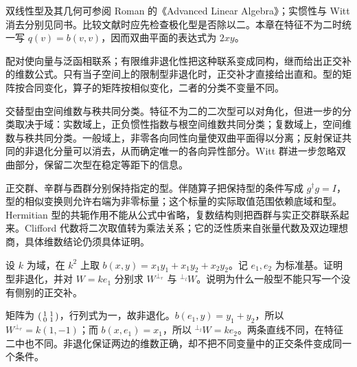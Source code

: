 \ProseParagraphBreak
双线性型及其几何可参阅 Roman 的《Advanced Linear Algebra》\cite[Chapter 11]{Roman2008AdvancedLinearAlgebra}；实惯性与 Witt 消去分别见同书\cite[Theorems 11.25--11.26, 11.34]{Roman2008AdvancedLinearAlgebra}。比较文献时应先检查极化型是否除以二。本章在特征不为二时统一写 \(q(v)=b(v,v)\)，因而双曲平面的表达式为 \(2xy\)。






\begin{chaptersummary}
	配对使向量与泛函相联系；有限维非退化性把这种联系变成同构，继而给出正交补的维数公式。只有当子空间上的限制型非退化时，正交补才直接给出直和。型的矩阵按合同变化，算子的矩阵按相似变化，二者的分类不变量不同。

	\ProseParagraphBreak
	交替型由空间维数与秩共同分类。特征不为二的二次型可以对角化，但进一步的分类取决于域：实数域上，正负惯性指数与根空间维数共同分类；复数域上，空间维数与秩共同分类。一般域上，非零各向同性向量使双曲平面得以分离；反射保证共同的非退化分量可以消去，从而确定唯一的各向异性部分。Witt 群进一步忽略双曲部分，保留二次型在稳定等距下的信息。

	\ProseParagraphBreak
	正交群、辛群与酉群分别保持指定的型。伴随算子把保持型的条件写成 \(g^\dagger g=I\)，型的相似变换则允许右端为非零标量；这个标量的实际取值范围依赖底域和型。Hermitian 型的共轭作用不能从公式中省略，复数结构则把酉群与实正交群联系起来。Clifford 代数将二次取值转为乘法关系；它的泛性质来自张量代数及双边理想商，具体维数结论仍须具体证明。
\end{chaptersummary}

\BookExercises

\begin{exercise}\label{b2:ex:10-left-right-orthogonals}
	设 \(k\) 为域，在 \(k^2\) 上取 \(b(x,y)=x_1y_1+x_1y_2+x_2y_2\)。记 \(e_1,e_2\) 为标准基。证明型非退化，并对 \(W=ke_1\) 分别求 \(W^{\perp_r}\) 与 \({}^{\perp_l}W\)。说明为什么一般型不能只写一个没有侧别的正交补。
\end{exercise}
\begin{solution}
	矩阵为 \(\begin{psmallmatrix}1&1\\0&1\end{psmallmatrix}\)，行列式为一，故非退化。\(b(e_1,y)=y_1+y_2\)，所以 \(W^{\perp_r}=k(1,-1)\)；而 \(b(x,e_1)=x_1\)，所以 \({}^{\perp_l}W=ke_2\)。两条直线不同，在特征二中也不同。非退化保证两边的维数正确，却不把不同变量中的正交条件变成同一个条件。
\end{solution}

